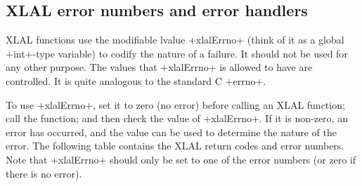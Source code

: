 \documentclass[10pt]{ligodcc}
\makeatletter
\def\verb{\relax\ifmmode\hbox\else\leavevmode\null\fi
  \bgroup
    \color{blue}\small
    \verb@eol@error \let\do\@makeother \dospecials
    \verbatim@font\@noligs
    \@ifstar\@sverb\@verb}
\makeatother
\begin{document}
\subsection{XLAL error numbers and error handlers}

XLAL functions use the modifiable lvalue \verb+xlalErrno+ (think of it as
a global \verb+int+-type variable) to codify the nature of a failure.  It
should not be used for any other purpose.  The values that \verb+xlalErrno+
is allowed to have are controlled.  It is quite analogous to the standard
C \verb+errno+.

To use \verb+xlalErrno+, set it to zero (no error) before calling an XLAL
function; call the function; and then check the value of \verb+xlalErrno+.
If it is non-zero, an error has occurred, and the value can be used to
determine the nature of the error.  The following table contains the XLAL
return codes and error numbers.  Note that \verb+xlalErrno+ should only be
set to one of the error numbers (or zero if there is no error).
\end{document}
